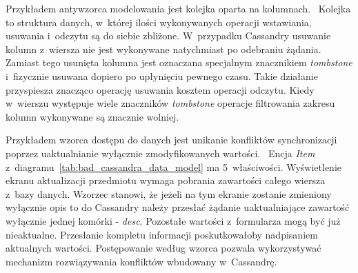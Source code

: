 Przykładem antywzorca modelowania jest kolejka oparta na kolumnach.~\cite{cassandra_queue_antipattern} Kolejka to struktura danych, w~której ilości wykonywanych operacji wstawiania, usuwania i~odczytu są do siebie zbliżone. W~przypadku Cassandry usuwanie kolumn z~wiersza nie jest wykonywane natychmiast po odebraniu żądania. Zamiast tego usunięta kolumna jest oznaczana specjalnym znacznikiem \emph{tombstone} i~fizycznie usuwana dopiero po upłynięciu pewnego czasu. Takie działanie przyspiesza znacząco operację usuwania kosztem operacji odczytu. Kiedy w~wierszu występuje wiele znaczników \emph{tombstone} operacje filtrowania zakresu kolumn wykonywane są znacznie wolniej.

Przykładem wzorca dostępu do danych jest unikanie konfliktów synchronizacji poprzez uaktualnianie wyłącznie zmodyfikowanych wartości.~\cite{cassandra_concepts_patterns_antipatterns} Encja \emph{Item} z~diagramu~\ref{tab:bad_cassandra_data_model} ma 5~właściwości. Wyświetlenie ekranu aktualizacji przedmiotu wymaga pobrania zawartości całego wiersza z~bazy danych. Wzorzec stanowi, że jeżeli na tym ekranie zostanie zmieniony wyłącznie opis to do Cassandry należy przesłać żądanie uaktualniające zawartość wyłącznie jednej komórki - \emph{desc}. Pozostałe wartości z~formularza mogą być już nieaktualne. Przesłanie kompletu informacji poskutkowałoby nadpisaniem aktualnych wartości. Postępowanie według wzorca pozwala wykorzystywać mechanizm rozwiązywania konfliktów wbudowany w~Cassandrę.


